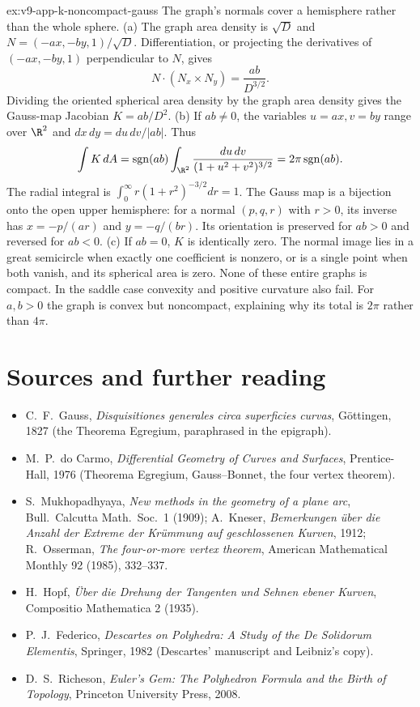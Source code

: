 \begin{solution}{ex:v9-app-k-noncompact-gauss}
\idea The graph's normals cover a hemisphere rather than the whole sphere.
\writeup (a) The graph area density is $\sqrt D$ and $N=(-ax,-by,1)/\sqrt D$. Differentiation, or projecting the derivatives of $(-ax,-by,1)$ perpendicular to $N$, gives
\[
N\cdot(N_x\times N_y)=\frac{ab}{D^{3/2}}.
\]
Dividing the oriented spherical area density by the graph area density gives the Gauss-map Jacobian $K=ab/D^2$.
(b) If $ab\ne0$, the variables $u=ax,v=by$ range over $\R^2$ and $dx\,dy=du\,dv/|ab|$. Thus
\[
\int K\,dA
=\operatorname{sgn}(ab)\int_{\R^2}\frac{du\,dv}{(1+u^2+v^2)^{3/2}}
=2\pi\operatorname{sgn}(ab).
\]
The radial integral is $\int_0^\infty r(1+r^2)^{-3/2}dr=1$. The Gauss map is a bijection onto the open upper hemisphere: for a normal $(p,q,r)$ with $r>0$, its inverse has $x=-p/(ar)$ and $y=-q/(br)$. Its orientation is preserved for $ab>0$ and reversed for $ab<0$.
(c) If $ab=0$, $K$ is identically zero. The normal image lies in a great semicircle when exactly one coefficient is nonzero, or is a single point when both vanish, and its spherical area is zero. None of these entire graphs is compact. In the saddle case convexity and positive curvature also fail. For $a,b>0$ the graph is convex but noncompact, explaining why its total is $2\pi$ rather than $4\pi$.
\end{solution}

\section*{Sources and further reading}

\begin{itemize}
\item C.~F.~Gauss, \emph{Disquisitiones generales circa superficies curvas}, G\"ottingen, 1827 (the Theorema Egregium, paraphrased in the epigraph).
\item M.~P.~do Carmo, \emph{Differential Geometry of Curves and Surfaces}, Prentice-Hall, 1976 (Theorema Egregium, Gauss--Bonnet, the four vertex theorem).
\item S.~Mukhopadhyaya, \emph{New methods in the geometry of a plane arc}, Bull.\ Calcutta Math.\ Soc.\ 1 (1909); A.~Kneser, \emph{Bemerkungen \"uber die Anzahl der
Extreme der Kr\"ummung auf geschlossenen Kurven}, 1912; R.~Osserman, \emph{The four-or-more vertex theorem}, American Mathematical Monthly 92 (1985), 332--337.
\item H.~Hopf, \emph{\"Uber die Drehung der Tangenten und Sehnen ebener Kurven}, Compositio Mathematica 2 (1935).
\item P.~J.~Federico, \emph{Descartes on Polyhedra: A Study of the De Solidorum Elementis}, Springer, 1982 (Descartes' manuscript and Leibniz's copy).
\item D.~S.~Richeson, \emph{Euler's Gem: The Polyhedron Formula and the Birth of Topology}, Princeton University Press, 2008.
\end{itemize}
